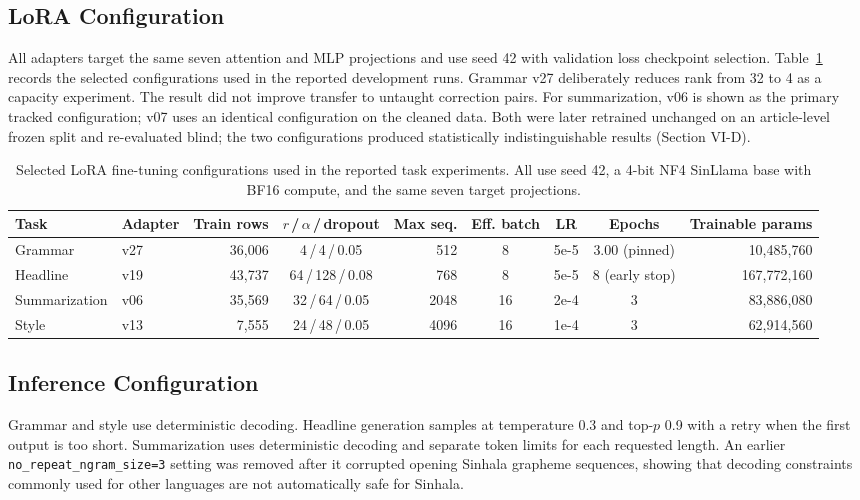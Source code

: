 \documentclass[a4paper,conference]{IEEEtran}
\begin{document}
\subsection{LoRA Configuration}
All adapters target the same seven attention and MLP projections and use seed
42 with validation loss checkpoint selection. Table~\ref{tab:config} records
the selected configurations used in the reported development runs. Grammar
v27 deliberately reduces rank from 32 to 4 as a capacity experiment. The
result did not improve transfer to untaught correction pairs. For summarization, v06 is shown
as the primary tracked configuration; v07 uses an identical configuration on
the cleaned data. Both were later retrained unchanged on an article-level
frozen split and re-evaluated blind; the two configurations produced
statistically indistinguishable results (Section VI-D).

\begin{table}[!t]
\caption{Selected LoRA fine-tuning configurations used in the reported task experiments. All use seed 42, a 4-bit NF4 SinLlama base with BF16 compute, and the same seven target projections.}
\label{tab:config}
\centering
\footnotesize
\setlength{\tabcolsep}{4pt}
\renewcommand{\arraystretch}{1.08}
\begin{tabular}{|l|l|r|c|r|c|c|c|r|}
\hline
\textbf{Task} & \textbf{Adapter} & \textbf{Train rows} & \textbf{$r$\,/\,$\alpha$\,/\,dropout} &
\textbf{Max seq.} & \textbf{Eff. batch} & \textbf{LR} & \textbf{Epochs} & \textbf{Trainable params} \\
\hline
Grammar       & v27 & 36,006 & 4\,/\,4\,/\,0.05    & 512  & 8  & 5e-5 & 3.00 (pinned)  & 10,485,760 \\
\hline
Headline      & v19 & 43,737 & 64\,/\,128\,/\,0.08 & 768  & 8  & 5e-5 & 8 (early stop) & 167,772,160 \\
\hline
Summarization & v06 & 35,569 & 32\,/\,64\,/\,0.05  & 2048 & 16 & 2e-4 & 3              & 83,886,080 \\
\hline
Style         & v13 & 7,555  & 24\,/\,48\,/\,0.05  & 4096 & 16 & 1e-4 & 3              & 62,914,560 \\
\hline
\end{tabular}
\end{table}

\subsection{Inference Configuration}
Grammar and style use deterministic decoding. Headline generation samples at
temperature 0.3 and top-$p$ 0.9 with a retry when the first output is too short. Summarization uses
deterministic decoding and separate token limits for each requested length. An earlier
\texttt{no\_repeat\_ngram\_size=3} setting was removed after it corrupted
opening Sinhala grapheme sequences, showing that decoding constraints commonly
used for other languages are not automatically safe for Sinhala.
\end{document}
